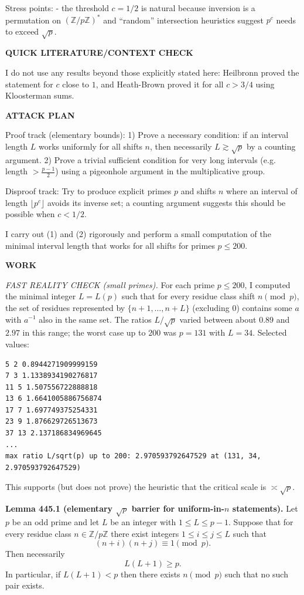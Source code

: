 Stress points:
- the threshold $c=1/2$ is natural because inversion is a permutation on $(\mathbb Z/p\mathbb Z)^*$ and ``random'' intersection heuristics suggest $p^c$ needs to exceed $\sqrt p$.

\medskip
\noindent\textbf{QUICK LITERATURE/CONTEXT CHECK}

I do not use any results beyond those explicitly stated here: Heilbronn proved the statement for $c$ close to $1$, and Heath-Brown proved it for all $c>3/4$ using Kloosterman sums.

\medskip
\noindent\textbf{ATTACK PLAN}

Proof track (elementary bounds):
1) Prove a necessary condition: if an interval length $L$ works uniformly for all shifts $n$, then necessarily $L\gtrsim \sqrt p$ by a counting argument.
2) Prove a trivial sufficient condition for very long intervals (e.g. length $>\tfrac{p-1}{2}$) using a pigeonhole argument in the multiplicative group.

Disproof track:
Try to produce explicit primes $p$ and shifts $n$ where an interval of length $\lfloor p^c\rfloor$ avoids its inverse set; a counting argument suggests this should be possible when $c<1/2$.

I carry out (1) and (2) rigorously and perform a small computation of the minimal interval length that works for all shifts for primes $p\le 200$.

\medskip
\noindent\textbf{WORK}

\noindent\emph{FAST REALITY CHECK (small primes).}
For each prime $p\le 200$, I computed the minimal integer $L=L(p)$ such that for every residue class shift $n\pmod p$, the set of residues represented by $\{n+1,\dots,n+L\}$ (excluding $0$) contains some $a$ with $a^{-1}$ also in the same set. The ratios $L/\sqrt p$ varied between about $0.89$ and $2.97$ in this range; the worst case up to $200$ was $p=131$ with $L=34$.
Selected values:
\begin{verbatim}
5 2 0.8944271909999159
7 3 1.1338934190276817
11 5 1.507556722888818
13 6 1.6641005886756874
17 7 1.697749375254331
23 9 1.876629726513673
37 13 2.137186834969645
...
max ratio L/sqrt(p) up to 200: 2.970593792647529 at (131, 34, 2.970593792647529)
\end{verbatim}
This supports (but does not prove) the heuristic that the critical scale is $\asymp \sqrt p$.

\medskip
\noindent\textbf{Lemma 445.1 (elementary $\sqrt p$ barrier for uniform-in-$n$ statements).}
Let $p$ be an odd prime and let $L$ be an integer with $1\le L\le p-1$. Suppose that for every residue class $n\in\mathbb Z/p\mathbb Z$ there exist integers $1\le i\le j\le L$ such that
\[
(n+i)(n+j)\equiv 1\pmod p.
\]
Then necessarily
\[
L(L+1)\ge p.
\]
In particular, if $L(L+1)<p$ then there exists $n\pmod p$ such that no such pair exists.

